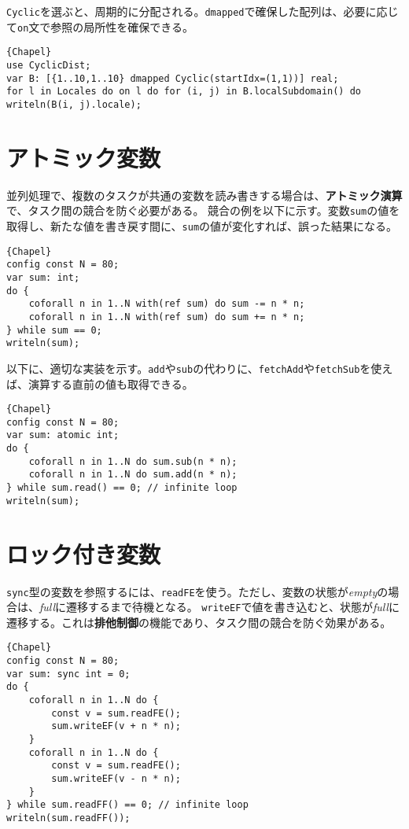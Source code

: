 \documentclass[10pt,a4paper]{book}
\begin{document}
\texttt{Cyclic}を選ぶと、周期的に分配される。\texttt{dmapped}で確保した配列は、必要に応じて\texttt{on}文で参照の局所性を確保できる。

\begin{Verbatim}{Chapel}
use CyclicDist;
var B: [{1..10,1..10} dmapped Cyclic(startIdx=(1,1))] real;
for l in Locales do on l do for (i, j) in B.localSubdomain() do writeln(B(i, j).locale);
\end{Verbatim}

\section{アトミック変数}

並列処理で、複数のタスクが共通の変数を読み書きする場合は、\textbf{アトミック演算}で、タスク間の競合を防ぐ必要がある。
競合の例を以下に示す。変数\texttt{sum}の値を取得し、新たな値を書き戻す間に、\texttt{sum}の値が変化すれば、誤った結果になる。

\begin{Verbatim}{Chapel}
config const N = 80;
var sum: int;
do {
	coforall n in 1..N with(ref sum) do sum -= n * n;
	coforall n in 1..N with(ref sum) do sum += n * n;
} while sum == 0;
writeln(sum);
\end{Verbatim}

以下に、適切な実装を示す。\texttt{add}や\texttt{sub}の代わりに、\texttt{fetchAdd}や\texttt{fetchSub}を使えば、演算する直前の値も取得できる。

\begin{Verbatim}{Chapel}
config const N = 80;
var sum: atomic int;
do {
	coforall n in 1..N do sum.sub(n * n);
	coforall n in 1..N do sum.add(n * n);
} while sum.read() == 0; // infinite loop
writeln(sum);
\end{Verbatim}

\section{ロック付き変数}

\texttt{sync}型の変数を参照するには、\texttt{readFE}を使う。ただし、変数の状態が\textit{empty}の場合は、\textit{full}に遷移するまで待機となる。
\texttt{writeEF}で値を書き込むと、状態が\textit{full}に遷移する。これは\textbf{排他制御}の機能であり、タスク間の競合を防ぐ効果がある。

\begin{Verbatim}{Chapel}
config const N = 80;
var sum: sync int = 0;
do {
	coforall n in 1..N do {
		const v = sum.readFE();
		sum.writeEF(v + n * n);
	}
	coforall n in 1..N do {
		const v = sum.readFE();
		sum.writeEF(v - n * n);
	}
} while sum.readFF() == 0; // infinite loop
writeln(sum.readFF());
\end{Verbatim}
\end{document}
